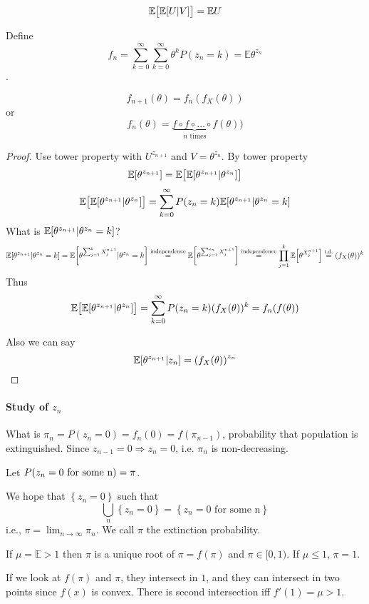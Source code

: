 \begin{definition}
$$\mathbb{E} \qty\big[\mathbb{E}\qty[U|V]] = \mathbb{E}U$$

Define $$f_{n} = \sum_{k=0}^\infty \sum_{k=0}^\infty \theta^{k} P(z_n=k) = \mathbb{E} \theta^{z_n}$$. 

\end{definition}
\begin{theorem}
$$f_{n+1} (\theta) = f_n (f_X(\theta))$$
or
$$f_{n} (\theta) = \underbrace{f\circ f\circ \dots \circ f}_{n \text{ times}}(\theta))$$
\begin{proof}
	
	Use tower property with $U^{z_{n+1}} $ and $V=\theta^{z_n}$.
	By tower property
	$$\mathbb{E} \qty[\theta^{z_{n+1}}] = \mathbb{E} \qty\big[\mathbb{E} \qty[\theta^{z_{n+1}}| \theta^{z_{n}}]]$$
	$$ \mathbb{E} \qty\big[\mathbb{E} \qty[\theta^{z_{n+1}}| \theta^{z_{n}}]] = \sum_{k=0}^\infty P(z_n=k) \mathbb{E} \qty[\theta^{z_{n+1}}| \theta^{z_{n}}=k]$$
What is $\mathbb{E} \qty[\theta^{z_{n+1}}| \theta^{z_{n}}=k]$?
$$\mathbb{E} \qty[\theta^{z_{n+1}}| \theta^{z_{n}}=k] =\mathbb{E} \qty[\theta^{\sum_{j=1}^{k} X_j^{n+1}}| \theta^{z_{n}}=k] \stackrel{\text{independence}}{=}\mathbb{E} \qty[\theta^{\sum_{j=1}^{z_n} X_j^{n+1}}]\stackrel{\text{independence}}{=} \prod_{j=1}^k \mathbb{E} \qty[\theta^{ X_j^{n+1}}] \stackrel{\text{i.d.}}{=} (f_X(\theta))^k $$
Thus
$$ \mathbb{E} \qty\big[\mathbb{E} \qty[\theta^{z_{n+1}}| \theta^{z_{n}}]] = \sum_{k=0}^\infty P(z_n=k) (f_X(\theta))^k = f_n(f(\theta))$$

Also we can say
$$\mathbb{E} \qty[\theta^{z_{n+1}}|z_n] = \qty(f_X(\theta))^{z_n}$$
\end{proof}
\end{theorem}

\paragraph{Study of $z_n$}
What is $\pi_n= P(z_n=0) = f_n(0) = f(\pi_{n-1})$, probability that population is extinguished. Since $z_{n-1} =0 \Rightarrow z_n=0$, i.e. $\pi_n$ is non-decreasing.

Let $P\qty(z_n=0 \text{ for some n}) = \pi$.

We hope that $\left\{ z_n=0 \right\}$ such that
$$\bigcup_n \left\{ z_n=0 \right\} = \left\{ z_n=0 \text{ for some n}\right\}$$
i.e., $\pi = \lim_{n\to \infty} \pi_n$. We call $\pi$ the extinction probability.

\begin{theorem}
	If $\mu=\mathbb{E} > 1$ then $\pi$ is a unique root of $\pi=f(\pi)$ and $\pi \in [0,1)$. If $\mu\leq 1$, $\pi=1$.
	
	If we look at $f(\pi)$ and $\pi$, they intersect in $1$, and they can intersect in two points since $f(x)$ is convex. There is second intersection iff $f'(1) = \mu > 1$.
\end{theorem}
